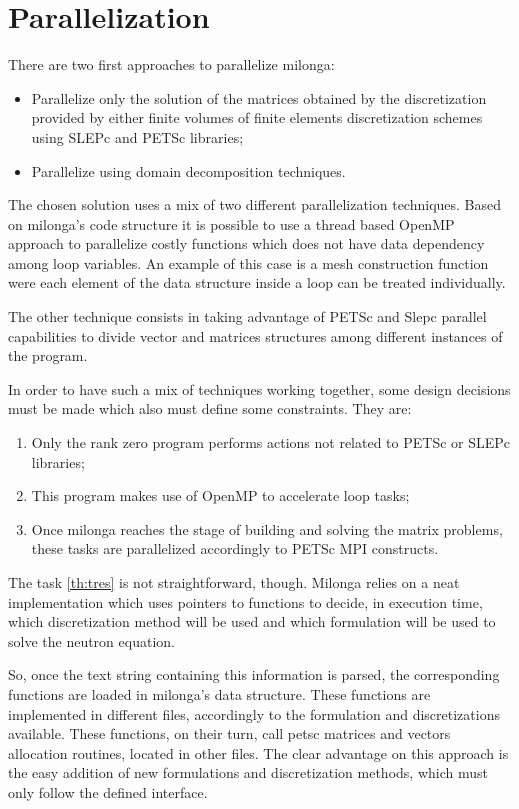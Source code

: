 \documentclass{anstrans}
\begin{document}
\section{Parallelization}

There are two first approaches to parallelize milonga:
\begin{itemize}
\item Parallelize only the solution of the matrices obtained by the discretization
  provided by either finite volumes of finite elements discretization schemes using
  SLEPc and PETSc libraries;
\item Parallelize using domain decomposition techniques.
\end{itemize}

The chosen solution uses a mix of two different parallelization techniques. Based 
on milonga's code structure it is possible to use a thread based OpenMP approach to 
parallelize costly functions which does not have data dependency among loop variables. An example of this case is a mesh construction function were each element of the data structure inside a loop can be treated individually.

The other technique consists in taking advantage of PETSc and Slepc parallel 
capabilities to divide vector and matrices structures among different instances 
of the program.

In order to have such a mix of techniques working together, some design decisions 
must be made which also must define some constraints. They are:

\begin{enumerate}
\item Only the rank zero program performs actions not related to PETSc or SLEPc 
libraries;
\item This program makes use of OpenMP to accelerate loop tasks;
\item\label{th:tres} Once milonga reaches the stage of building and solving the matrix problems, these tasks are parallelized accordingly to PETSc MPI constructs.
\end{enumerate}

The task \ref{th:tres} is not straightforward, though. Milonga relies on a neat 
implementation which uses pointers to functions to decide, in execution time, 
which discretization method will be used and which formulation will be used to solve the neutron equation.

So, once the text string containing this information is parsed, the corresponding 
functions are loaded in milonga's data structure. These functions are implemented 
in different files, accordingly to the formulation and discretizations available. 
These functions, on their turn, call petsc matrices and vectors allocation 
routines, located in other files. The clear advantage on this approach is the 
easy addition of new formulations and discretization methods, which must only 
follow the defined interface.
\end{document}

